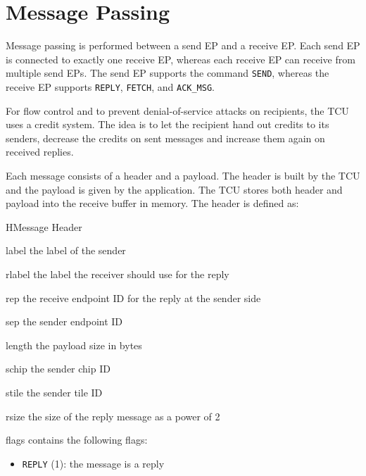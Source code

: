 \section{Message Passing}

Message passing is performed between a send EP and a receive EP. Each send EP is connected to
exactly one receive EP, whereas each receive EP can receive from multiple send EPs. The send EP
supports the command \texttt{SEND}, whereas the receive EP supports \texttt{REPLY}, \texttt{FETCH},
and \texttt{ACK\_MSG}.

For flow control and to prevent denial-of-service attacks on recipients, the TCU uses a credit
system. The idea is to let the recipient hand out credits to its senders, decrease the credits on
sent messages and increase them again on received replies.

Each message consists of a header and a payload. The header is built by the TCU and the payload is
given by the application. The TCU stores both header and payload into the receive buffer in memory.
The header is defined as:

\begin{register}{H}{Message Header}{}
  \regnewline%
  \regnewline%
  \regnewline%
  \begin{regdesc}\begin{reglist}
    \item[label] the label of the sender
    \item[rlabel] the label the receiver should use for the reply
    \item[rep] the receive endpoint ID for the reply at the sender side
    \item[sep] the sender endpoint ID
    \item[length] the payload size in bytes
    \item[schip] the sender chip ID
    \item[stile] the sender tile ID
    \item[rsize] the size of the reply message as a power of 2
    \item[flags] contains the following flags:
    \begin{itemize}
      \item \texttt{REPLY} (1): the message is a reply
    \end{itemize}
  \end{reglist}\end{regdesc}
\end{register}

